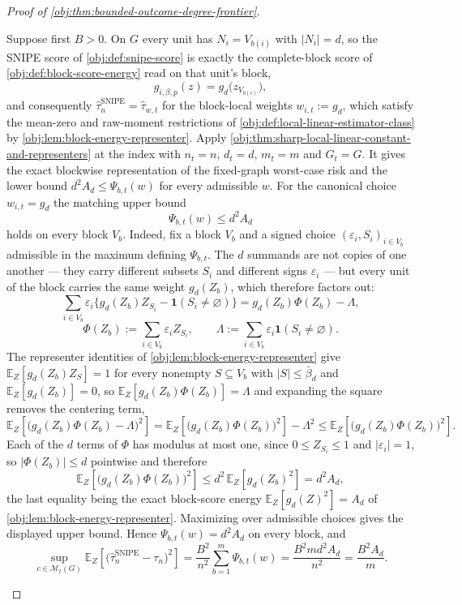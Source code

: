 \begin{proof}[Proof of \cref{obj:thm:bounded-outcome-degree-frontier}]
\begin{enumerate}
Suppose first \(B>0\).  On \(G\) every unit has \(N_i=V_{b(i)}\) with
\(|N_i|=d\), so the SNIPE score of \cref{obj:def:snipe-score} is exactly the
complete-block score of \cref{obj:def:block-score-energy} read on that unit's
block,
\[
g_{i,\beta,p}(z)=g_d\bigl(z_{V_{b(i)}}\bigr),
\]
and consequently \(\widehat\tau_n^{\mathrm{SNIPE}}=\widehat\tau_{w,t}\) for the
block-local weights \(w_{i,t}:=g_d\), which satisfy the mean-zero and raw-moment
restrictions of \cref{obj:def:local-linear-estimator-class} by
\cref{obj:lem:block-energy-representer}.  Apply
\cref{obj:thm:sharp-local-linear-constant-and-representers} at the index with
\(n_t=n\), \(d_t=d\), \(m_t=m\) and \(G_t=G\).  It gives the exact blockwise
representation of the fixed-graph worst-case risk and the lower bound
\(d^2A_d\le\Psi_{b,t}(w)\) for every admissible \(w\).  For the canonical choice
\(w_{i,t}=g_d\) the matching upper bound
\[
\Psi_{b,t}(w)\le d^2A_d
\]
holds on every block \(V_b\).  Indeed, fix a block \(V_b\) and a signed choice
\((\varepsilon_i,S_i)_{i\in V_b}\) admissible in the maximum defining
\(\Psi_{b,t}\).  The \(d\) summands are not copies of one another — they carry
different subsets \(S_i\) and different signs \(\varepsilon_i\) — but every unit
of the block carries the same weight \(g_d(Z_b)\), which therefore factors out:
\[
\sum_{i\in V_b}\varepsilon_i\bigl\{g_d(Z_b)Z_{S_i}-\mathbf 1(S_i\ne\varnothing)\bigr\}
=
g_d(Z_b)\Phi(Z_b)-\Lambda,
\]
\[
\Phi(Z_b):=\sum_{i\in V_b}\varepsilon_iZ_{S_i},
\qquad
\Lambda:=\sum_{i\in V_b}\varepsilon_i\mathbf 1(S_i\ne\varnothing).
\]
The representer identities of \cref{obj:lem:block-energy-representer} give
\(\mathbb E_Z[g_d(Z_b)Z_S]=1\) for every nonempty \(S\subseteq V_b\) with
\(|S|\le\bar\beta_d\) and \(\mathbb E_Z[g_d(Z_b)]=0\), so
\(\mathbb E_Z[g_d(Z_b)\Phi(Z_b)]=\Lambda\) and expanding the square removes the
centering term,
\[
\mathbb E_Z\!\left[\bigl(g_d(Z_b)\Phi(Z_b)-\Lambda\bigr)^2\right]
=
\mathbb E_Z\!\left[\bigl(g_d(Z_b)\Phi(Z_b)\bigr)^2\right]-\Lambda^2
\le
\mathbb E_Z\!\left[\bigl(g_d(Z_b)\Phi(Z_b)\bigr)^2\right].
\]
Each of the \(d\) terms of \(\Phi\) has modulus at most one, since
\(0\le Z_{S_i}\le1\) and \(|\varepsilon_i|=1\), so \(|\Phi(Z_b)|\le d\)
pointwise and therefore
\[
\mathbb E_Z\!\left[\bigl(g_d(Z_b)\Phi(Z_b)\bigr)^2\right]
\le
d^2\,\mathbb E_Z\!\left[g_d(Z_b)^2\right]
=
d^2A_d ,
\]
the last equality being the exact block-score energy
\(\mathbb E_Z[g_d(Z)^2]=A_d\) of \cref{obj:lem:block-energy-representer}.
Maximizing over admissible choices gives the displayed upper bound.
Hence \(\Psi_{b,t}(w)=d^2A_d\) on every block, and
\[
\sup_{c\in\mathcal M_t(G)}
\mathbb E_Z\!\left[
\bigl(\widehat\tau_n^{\mathrm{SNIPE}}-\tau_n\bigr)^2
\right]
=
\frac{B^2}{n^2}\sum_{b=1}^{m}\Psi_{b,t}(w)
=
\frac{B^2md^2A_d}{n^2}
=
\frac{B^2A_d}{m}.
\]


\end{enumerate}
\end{proof}
